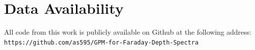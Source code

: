 \documentclass[fleqn,usenatbib]{mnras}
\begin{document}
\section*{Data Availability}

All code from this work is publicly available on Github at the following  address: {\tt https://github.com/as595/GPM-for-Faraday-Depth-Spectra }












\bsp	%
\label{lastpage}
\end{document}
